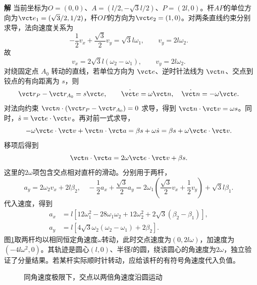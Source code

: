 \documentclass[11pt,openany,fontset=fandol]{ctexbook}
\theoremstyle{definition}\newtheorem{example}{例}[chapter]\newtheorem{exercise}{习题}[chapter]
\newcommand{\SolutionStart}{\par\medskip\ifdim\pagetotal>0pt\ifdim\dimexpr\pagegoal-\pagetotal\relax<3\baselineskip\newpage\fi\fi\noindent\textbf{解}\quad\ignorespaces}
\newenvironment{solution}{\SolutionStart}{\par\medskip}
\begin{document}
\begin{solution}
当前坐标为$O=(0,0)$、$A=(l/2,-\sqrt3l/2)$、$P=(2l,0)$。杆$AP$的单位方向为$\vct e_1=(\sqrt3/2,1/2)$，杆$OP$的方向为$\vct e_2=(1,0)$。对两条直线约束分别求导，法向速度关系为
\[
 -\frac12v_x+\frac{\sqrt3}{2}v_y=\sqrt3l\omega_1,
 \qquad v_y=2l\omega_2.
\]
故
\[
 \boxed{v_x=2\sqrt3l(\omega_2-\omega_1),\qquad v_y=2l\omega_2.}
\]
对绕固定点 $A_0$ 转动的直线，若单位方向为 $\vct e$、逆时针法线为 $\vct n$、交点到铰点的有向距离为 $s$，则
\[
\vct r_P-\vct r_{A_0}=s\vct e,\qquad
\dot{\vct e}=\omega\vct n,\quad \dot{\vct n}=-\omega\vct e.
\]
对法向约束 $\vct n\cdot(\vct r_P-\vct r_{A_0})=0$ 求导，得到 $\vct n\cdot\vct v=\omega s$。同时，$\dot s=\vct e\cdot\vct v$。再对前一式求导，
\[
-\omega\vct e\cdot\vct v+\vct n\cdot\vct a
=\beta s+\omega\dot s
=\beta s+\omega\vct e\cdot\vct v.
\]
移项后得到
\[
 \vct n\cdot\vct a=2\omega\vct e\cdot\vct v+\beta s.
\]
这里的$2\omega$项包含交点相对直杆的滑动。分别用于两杆，
\[
 a_y=2\omega_2v_x+2l\beta_2,
 \quad-\frac12a_x+\frac{\sqrt3}{2}a_y
 =2\omega_1\left(\frac{\sqrt3}{2}v_x+\frac12v_y\right)+\sqrt3l\beta_1.
\]
代入速度，得到
\[
 \boxed{\begin{aligned}
 a_x&=l[12\omega_1^2-28\omega_1\omega_2+12\omega_2^2
       +2\sqrt3(\beta_2-\beta_1)],\\
 a_y&=l[4\sqrt3\omega_2(\omega_2-\omega_1)+2\beta_2].
 \end{aligned}}
\]
图\ref{mp2:fig:rev:intersection-s}取两杆均以相同恒定角速度$\omega$转动，此时交点速度为$(0,2l\omega)$，加速度为$(-4l\omega^2,0)$。其轨迹是圆心$(l,0)$、半径$l$的圆，绕该圆心的角速度为$2\omega$，独立验证了分量结果。若某杆实际顺时针转动，应给该杆的有符号角速度代入负值。

\begin{figure}[H]\centering
{}
\caption{同角速度极限下，交点以两倍角速度沿圆运动}\label{mp2:fig:rev:intersection-s}
\end{figure}

\end{solution}
\end{document}
